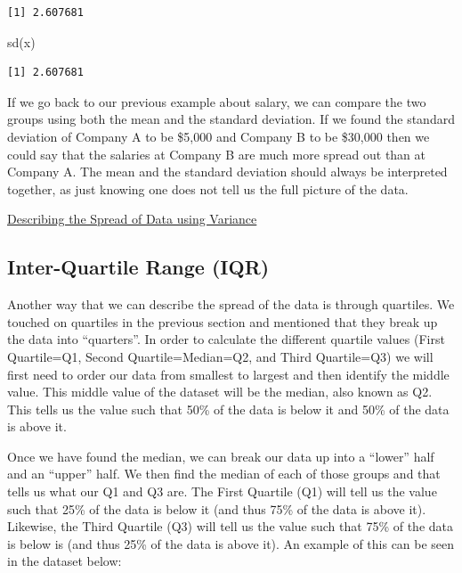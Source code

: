 \documentclass[
  letterpaper,
  DIV=11,
  numbers=noendperiod]{scrreprt}
\newenvironment{Shaded}{\begin{snugshade}}{\end{snugshade}}
\newcommand{\FunctionTok}[1]{\textcolor[rgb]{0.28,0.35,0.67}{#1}}
\newcommand{\NormalTok}[1]{\textcolor[rgb]{0.00,0.23,0.31}{#1}}
\begin{document}
\begin{verbatim}
[1] 2.607681
\end{verbatim}

\begin{Shaded}
\begin{Highlighting}[]
\FunctionTok{sd}\NormalTok{(x)}
\end{Highlighting}
\end{Shaded}

\begin{verbatim}
[1] 2.607681
\end{verbatim}

If we go back to our previous example about salary, we can compare the
two groups using both the mean and the standard deviation. If we found
the standard deviation of Company A to be \$5,000 and Company B to be
\$30,000 then we could say that the salaries at Company B are much more
spread out than at Company A. The mean and the standard deviation should
always be interpreted together, as just knowing one does not tell us the
full picture of the data.

\begin{watch}{}{}
    \href{https://youtu.be/8_7Qht9poF0}{Describing the Spread of Data using Variance}
\end{watch}

\subsection{Inter-Quartile Range (IQR)}\label{inter-quartile-range-iqr}

Another way that we can describe the spread of the data is through
quartiles. We touched on quartiles in the previous section and mentioned
that they break up the data into ``quarters''. In order to calculate the
different quartile values (First Quartile=Q1, Second Quartile=Median=Q2,
and Third Quartile=Q3) we will first need to order our data from
smallest to largest and then identify the middle value. This middle
value of the dataset will be the median, also known as Q2. This tells us
the value such that 50\% of the data is below it and 50\% of the data is
above it.

Once we have found the median, we can break our data up into a ``lower''
half and an ``upper'' half. We then find the median of each of those
groups and that tells us what our Q1 and Q3 are. The First Quartile (Q1)
will tell us the value such that 25\% of the data is below it (and thus
75\% of the data is above it). Likewise, the Third Quartile (Q3) will
tell us the value such that 75\% of the data is below is (and thus 25\%
of the data is above it). An example of this can be seen in the dataset
below:
\end{document}
